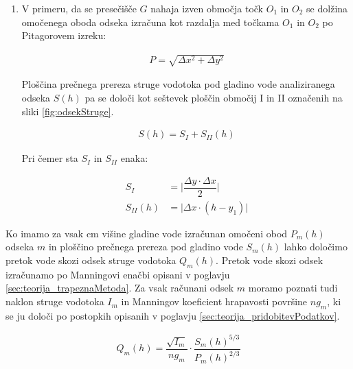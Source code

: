 \begin{enumerate}
\begin{enumerate}
	
	\item V primeru, da se presečišče $G$ nahaja izven območja točk $O_1$ in $O_2$ se dolžina omočenega oboda odseka izračuna kot razdalja med točkama $O_1$ in $O_2$ po Pitagorovem izreku:
	
	\begin{ceqn}
		\begin{align}
		P = \sqrt{ \Delta x^{2} + \Delta y^{2}}
		\end{align}
	\end{ceqn}
	
	Ploščina prečnega prereza struge vodotoka pod gladino vode analiziranega odseka $S(h)$ pa se določi kot seštevek ploščin območij I in II označenih na sliki \ref{fig:odsekStruge}.
	
	\begin{ceqn}
		\begin{align}
		S(h) = S_I + S_{II}(h)
		\end{align}
	\end{ceqn}
	
	Pri čemer sta $S_I$ in $S_{II}$ enaka:
	
		\begin{ceqn}
			\begin{align}
			S_I&= \bigg|\dfrac{ \Delta y \cdot  \Delta x}{2}\bigg|\\
			S_{II}(h)&= \bigg|\Delta x \cdot (h - y_1)\bigg|
			\end{align}
		\end{ceqn}
		
			
		
	\end{enumerate}

\end{enumerate}



Ko imamo za vsak cm višine gladine vode izračunan omočeni obod $P_m(h)$ odseka $m$ in ploščino prečnega prereza pod gladino vode $S_m(h)$ lahko določimo pretok vode skozi odsek struge vodotoka $Q_m(h)$. Pretok vode skozi odsek izračunamo po Manningovi enačbi opisani v poglavju \ref{sec:teorija_trapeznaMetoda}. Za vsak računani odsek $m$ moramo poznati tudi naklon struge vodotoka $I_m$ in  Manningov koeficient hrapavosti površine $ng_m$, ki se ju določi po postopkih opisanih v poglavju \ref{sec:teorija_pridobitevPodatkov}.


\begin{ceqn}
	\begin{align}
	Q_m(h) = \dfrac{\sqrt{I_m}}{ng_m} \cdot \dfrac{S_m(h)^{5/3}}{P_m(h)^{2/3}}
	\end{align}
\end{ceqn}


